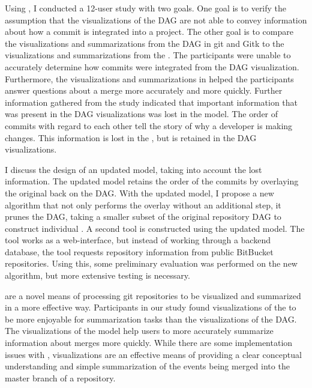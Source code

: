 Using \tool{}, I conducted a 12-user study with two goals. One goal is
to verify the assumption that the visualizations of the DAG are not able
to convey information about how a commit is integrated into a project.
The other goal is to compare the visualizations and summarizations from
the DAG in git and Gitk to the visualizations and summarizations from
the \mt{}. The participants were unable to accurately determine how
commits were integrated from the DAG visualization. Furthermore, the
visualizations and summarizations in \tool{} helped the participants
answer questions about a merge more accurately and more quickly. Further
information gathered from the study indicated that important information
that was present in the DAG visualizations was lost in the \mt{} model.
The order of commits with regard to each other tell the story of why a
developer is making changes. This information is lost in the \mt{}, but
is retained in the DAG visualizations.

I discuss the design of an updated model, taking into account the lost
information. The updated model retains the order of the commits by
overlaying the original \mt{} back on the DAG\@. With the updated model, I
propose a new algorithm that not only performs the overlay without an
additional step, it prunes the DAG, taking a smaller subset of the
original repository DAG to construct individual . A second tool is
constructed using the updated model. The tool works as a web-interface,
but instead of working through a backend database, the tool requests
repository information from public BitBucket repositories. Using this,
some preliminary evaluation was performed on the new algorithm, but more
extensive testing is necessary.

 are a novel means of processing git repositories to be visualized
and summarized in a more effective way. Participants in our study found
visualizations of the \mt{} to be more enjoyable for summarization tasks
than the visualizations of the DAG. The visualizations of the \mt{}
model help users to more accurately summarize information about merges
more quickly. While there are some implementation issues with \tool{},
\mt{} visualizations are an effective means of providing a clear
conceptual understanding and simple summarization of the events being
merged into the master branch of a repository.
